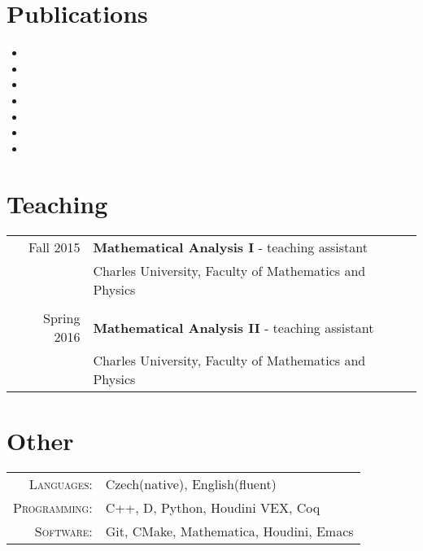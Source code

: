 \documentclass[a4paper,10pt]{article} %
\begin{document}

\section{Publications}

\begin{itemize}
\item {}
\item {}
\item {}
\item {}
\item {}
\item {}
\item {}
\end{itemize}


\section{Teaching}

\begin{tabular}{rl}
  Fall 2015 & \textbf{Mathematical Analysis I} - teaching assistant \\
            & Charles University, Faculty of Mathematics and Physics \\
            & \\

  Spring 2016 & \textbf{Mathematical Analysis II} - teaching assistant \\
            & Charles University, Faculty of Mathematics and Physics \\
\end{tabular}


\section{Other}

\begin{tabular}{rl}
  \textsc{Languages}:   & Czech(native), English(fluent) \\
  \textsc{Programming}: & C++, D, Python, Houdini VEX, Coq\\
  \textsc{Software}:    & Git, CMake, Mathematica, Houdini, Emacs
\end{tabular}

\end{document}
